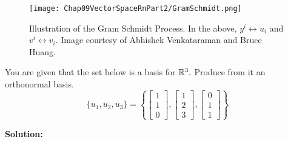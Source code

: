 \begin{figure}[t!]
\centering
\texttt{[image: Chap09VectorSpaceRnPart2/GramSchmidt.png]}
\caption[]{Illustration of the Gram Schmidt Process. In the above, $y^i \leftrightarrow u_i$ and $v^i  \leftrightarrow v_i$. Image courtesy of Abhishek Venkataraman and Bruce Huang.} 
\end{figure}


\begin{example}
\label{ex:OrthonormalBasis}
You are given that the set below is a basis for $\mathbb R^3.$ Produce from it an orthonormal basis.
\begin{equation*}
	\{ u_1, u_2, u_3\} = \left\{
		\left[ \begin{array}{c} 1 \\ 1 \\ 0 \end{array} \right],
		\left[ \begin{array}{c} 1 \\ 2 \\ 3 \end{array} \right],
		\left[ \begin{array}{c} 0 \\ 1 \\ 1 \end{array} \right]
		\right\}
\end{equation*}

\end{example}

\textbf{Solution:} 

